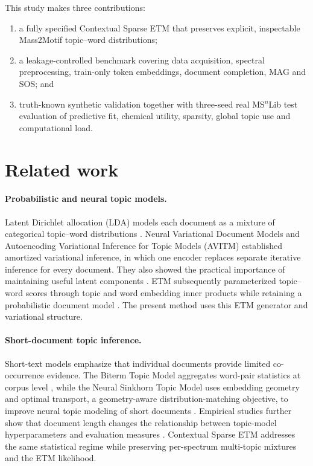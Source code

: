 \documentclass[10pt,a4paper]{article}
\begin{document}
This study makes three contributions:
\begin{enumerate}
  \item a fully specified Contextual Sparse ETM that preserves explicit,
  inspectable Mass2Motif topic--word distributions;
  \item a leakage-controlled benchmark covering data acquisition, spectral
  preprocessing, train-only token embeddings, document completion, MAG and SOS;
  and
  \item truth-known synthetic validation together with three-seed real
  MS$^{n}$Lib test evaluation of predictive fit, chemical utility, sparsity, global
  topic use and computational load.
\end{enumerate}

\section{Related work}

\paragraph{Probabilistic and neural topic models.}
Latent Dirichlet allocation (LDA) models each document as a mixture of
categorical topic--word distributions \cite{blei2003}. Neural Variational
Document Models and Autoencoding Variational Inference for Topic Models (AVITM)
established amortized variational inference, in which one encoder replaces
separate iterative inference for every document. They also showed the practical
importance of maintaining useful latent components
\cite{miao2016,srivastava2017}. ETM subsequently parameterized topic--word
scores through topic and word embedding inner products while retaining a
probabilistic document model \cite{dieng2020}. The present method uses this ETM
generator and variational structure.

\paragraph{Short-document topic inference.}
Short-text models emphasize that individual documents provide limited
co-occurrence evidence. The Biterm Topic Model aggregates word-pair statistics
at corpus level \cite{yan2013}, while the Neural Sinkhorn Topic Model uses
embedding geometry and optimal transport, a geometry-aware
distribution-matching objective, to improve neural topic modeling of short
documents \cite{zhao2021}. Empirical studies further show that document
length changes the relationship between topic-model hyperparameters and
evaluation measures \cite{terragni2021}. Contextual Sparse ETM addresses
the same statistical regime while preserving per-spectrum multi-topic mixtures
and the ETM likelihood.
\end{document}

